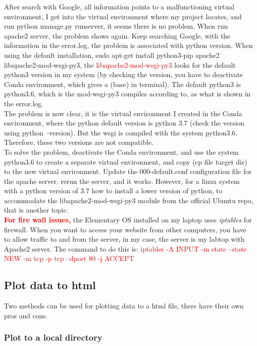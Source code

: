 \documentclass[UTF8,fancyhdr,a4paper]{ctexart}
\newcommand{\pflred}[1]{\textcolor{red}{#1}}
\begin{document}
After search with Google, all information points to a malfunctioning virtual environment, I get into the virtual environment where my project locates, and run python manage.py runserver, it seems there is no problem. When run apache2 server, the problem shows again. Keep searching Google, with the information in the error.log, the problem is associated with python version. When using the default installation, sudo apt-get install python3-pip apache2 libapache2-mod-wsgi-py3, the \pflred{libapache2-mod-wsgi-py3} looks for the default python3 version in my system (by checking the version, you have to deactivate Conda environment, which gives a (base) in terminal). The default python3 is python3.6, which is the mod-wsgi-py3 compiles according to, as what is shown in the error.log.\\

The problem is now clear, it is the virtual environment I created in the Conda environment, where the python default version is python 3.7 (check the version using python --version). But the wsgi is compiled with the system python3.6. Therefore, these two versions are not compatible. \\

To solve the problem, deactivate the Conda environment, and use the system python3.6 to create a separate virtual environment, and copy (cp file target dir) to the new virtual environment. Update the 000-default.conf configuration file for the apache server. rerun the server, and it works. However, for a linux system with a python version of 3.7 how to install a lower version of python, to accommodate the libapache2-mod-wsgi-py3 module from the official Ubuntu repo, that is another topic.\\

\textbf{\pflred{For fire wall issues,}} the Elementary OS installed on my laptop uses \emph{ iptables } for firewall. When you want to access your website from other computers, you have to allow traffic to and from the server, in my case, the server is my labtop with Apache2 server. The command to do this is: \pflred{iptables -A INPUT -m state --state NEW -m tcp -p tcp --dport 80 -j ACCEPT}



\subsection{Plot data to html}
Two methods can be used for plotting data to a html file, there have their own pros and cons.
\subsubsection{Plot to a local directory}
\end{document}
